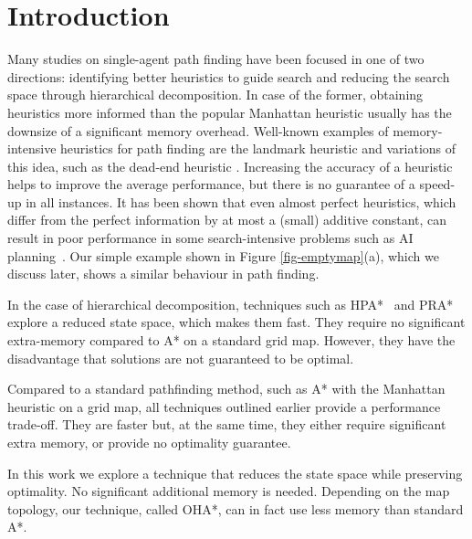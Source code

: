 \section{Introduction}
Many studies on single-agent path finding have been focused in one of two directions:
identifying better heuristics to 
guide search and reducing the search space through hierarchical decomposition.
In case of the former, obtaining heuristics more informed than the popular
Manhattan heuristic usually has the downsize of a significant memory overhead.
Well-known examples of memory-intensive heuristics for path finding are
the landmark heuristic \cite{} and variations of this idea, such as the dead-end heuristic \cite{}.
Increasing the accuracy of a heuristic helps to improve the average performance,
but there is no guarantee of a speed-up in all instances.
It has been shown that even almost perfect heuristics,
which differ from the perfect information by at most a (small) additive constant,
can result in poor performance in some search-intensive problems such as AI planning~\cite{malte08,korf98}.
Our simple example shown in Figure \ref{fig-emptymap}(a), which we discuss later,
shows a similar behaviour in path finding.

In the case of hierarchical decomposition, techniques such as
HPA*~\cite{} and PRA*~\cite{} explore a reduced state space, 
which makes them fast. They require no significant extra-memory
compared to A* on a standard grid map.
However, they have the disadvantage that solutions are not guaranteed 
to be optimal.

Compared to a standard pathfinding method, such as A* with 
the Manhattan heuristic on a grid map,
all techniques outlined earlier provide a performance trade-off.
They are faster but, at the same time, they either require significant
extra memory, or provide no optimality guarantee.

In this work we explore a technique that reduces the state space while preserving optimality.
No significant additional memory is needed. Depending on the map topology,
our technique, called OHA*, can in fact use less memory than standard A*.


